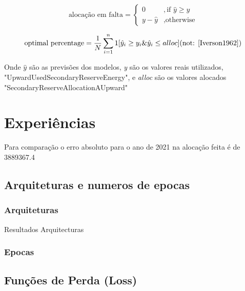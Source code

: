 \begin{equation} 
    \label{eq:miss_alloc} 
    \text{alocação em falta} = 
    \begin{cases} 
        0 & ,\text{if } \hat{y} \geq y \\
        y - \hat{y} & ,\text{otherwise} 
    \end{cases} 
\end{equation}

\begin{equation} 
    \label{eq:opt_perc} 
    \text{optimal percentage} = \frac{1}{N} \sum_{i=1}^{n} 1 [\hat{y}_i \geq y_i  \&  \hat{y}_i \leq alloc]
    \text{(not: \cite{Iverson1962})}
\end{equation}


Onde \textit{$\hat{y}$} são as previsões dos modelos, \textit{y} são os valores reais utilizados, "UpwardUsedSecondaryReserveEnergy", e \textit{alloc} são os valores alocados "SecondaryReserveAllocationAUpward"


\section{Experiências\label{se:experiments}}

Para comparação o erro absoluto para o ano de 2021 na alocação feita é de 3889367.4

\subsection{Arquiteturas e numeros de epocas\label{se:archs_epocs}}

\subsubsection{Arquiteturas\label{se:archs_res}}


\begin{table}[H]
\caption{Resultados Arquitecturas}            
\resizebox{\linewidth}{!}{}
\end{table}

\subsubsection{Epocas\label{se:epocas_res}}

\subsection{Funções de Perda (Loss) \label{se:loss_exp}}

